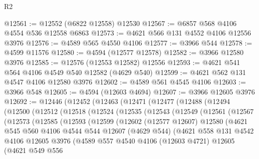 \begin{lexlean}{R2}
\begin{coremodule}
@12561 := @12552 (@6822 @12558) @12530
@12567 := @6857 @568 @4106 @4554 @536 @12558 @6863
@12573 := @4621 @566 @131 @4552 @4106 @12556 @3976
@12576 := @4589 @565 @4550 @4106
@12577 := @3966 @544
@12578 := @4599 @11576
@12580 := @4594 (@12577 @12578)
@12582 := @3966 @12580 @3976
@12585 := @12576 (@12553 @12582) @12556
@12593 := @4621 @541 @564 @4106 @4549 @540 @12582 (@4629 @540)
@12599 := @4621 @562 @131 @4547 @4106 @12580 @3976
@12602 := @4589 @561 @4545 @4106
@12603 := @3966 @548
@12605 := @4594 (@12603 @4694)
@12607 := @3966 @12605 @3976
@12692 := @12446
    (@12452
      (@12463
        (@12471
          (@12477
            (@12488
              (@12494
                (@12500
                  (@12512
                    (@12518
                      (@12524
                        (@12535
                          (@12543
                            (@12549
                              (@12561
                                (@12567
                                  (@12573
                                    (@12585
                                      (@12593
                                        (@12599
                                          (@12602
                                            (@12577 @12607)
                                            @12580
                                            (@4621
                                              @545
                                              @560
                                              @4106
                                              @4544
                                              @544
                                              @12607
                                              (@4629 @544)
                                              (@4621
                                                @558
                                                @131
                                                @4542
                                                @4106
                                                @12605
                                                @3976
                                                (@4589
                                                  @557
                                                  @4540
                                                  @4106
                                                  (@12603 @4721)
                                                  @12605
                                                  (@4621
                                                    @549
                                                    @556

\end{coremodule}
\end{lexlean}
